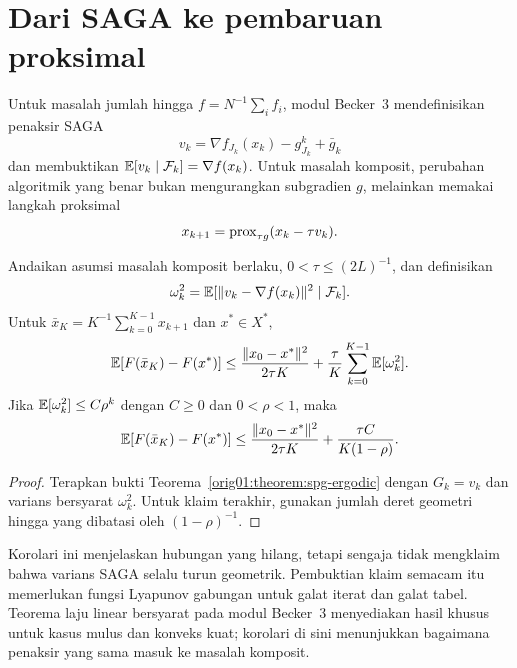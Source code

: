 \section{Dari SAGA ke pembaruan proksimal}
\label{orig01:section:prox-saga}

Untuk masalah jumlah hingga
$f=N^{-1}\sum_i f_i$, modul Becker~3 mendefinisikan penaksir SAGA
\begin{equation}
  v_k=\nabla f_{J_k}(x_k)-g_{J_k}^k+\bar g_k
\end{equation}
dan membuktikan
$\mathbb{E}[v_k\mid\mathcal F_k]=\nabla f(x_k)$. Untuk masalah komposit, perubahan
algoritmik yang benar bukan mengurangkan subgradien $g$, melainkan memakai
langkah proksimal
\begin{equation}
  \label{orig01:eq:prox-saga}
  x_{k+1}=\mathrm{prox}_{\tau g}(x_k-\tau v_k).
\end{equation}

\begin{cor}
  \label{orig01:cor:prox-saga-bridge}
  Andaikan asumsi masalah komposit berlaku, $0<\tau\leq(2L)^{-1}$, dan
  definisikan
  \begin{equation}
    \omega_k^2
    =\mathbb{E}[\|v_k-\nabla f(x_k)\|^2\mid\mathcal F_k].
  \end{equation}
  Untuk $\bar x_K=K^{-1}\sum_{k=0}^{K-1}x_{k+1}$ dan $x^*\in X^*$,
  \begin{equation}
    \label{orig01:eq:prox-saga-bridge}
    \mathbb{E}[F(\bar x_K)-F(x^*)]
    \leq\frac{\|x_0-x^*\|^2}{2\tau K}
    +\frac{\tau}{K}\sum_{k=0}^{K-1}\mathbb{E}[\omega_k^2].
  \end{equation}
  Jika $\mathbb{E}[\omega_k^2]\leq C\rho^k$ dengan $C\geq0$ dan $0<\rho<1$, maka
  \begin{equation}
    \mathbb{E}[F(\bar x_K)-F(x^*)]
    \leq\frac{\|x_0-x^*\|^2}{2\tau K}
    +\frac{\tau C}{K(1-\rho)}.
  \end{equation}
\end{cor}

\begin{proof}
  Terapkan bukti Teorema~\ref{orig01:theorem:spg-ergodic} dengan
  $G_k=v_k$ dan varians bersyarat $\omega_k^2$. Untuk klaim terakhir, gunakan
  jumlah deret geometri hingga yang dibatasi oleh $(1-\rho)^{-1}$.
\end{proof}

Korolari ini menjelaskan hubungan yang hilang, tetapi sengaja tidak mengklaim
bahwa varians SAGA selalu turun geometrik. Pembuktian klaim semacam itu
memerlukan fungsi Lyapunov gabungan untuk galat iterat dan galat tabel.
Teorema laju linear bersyarat pada modul Becker~3 menyediakan hasil khusus
untuk kasus mulus dan konveks kuat; korolari di sini menunjukkan bagaimana
penaksir yang sama masuk ke masalah komposit.

